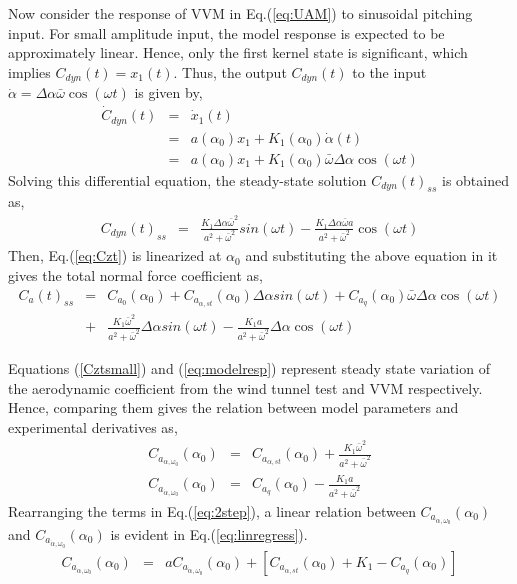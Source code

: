 \documentclass{AIAA}
\begin{document}
Now consider the response of VVM in Eq.(\ref{eq:UAM}) to sinusoidal pitching input. For small amplitude input, the model response is expected to be approximately linear. Hence, only the first kernel state is significant, which implies $C_{dyn}(t)=x_1(t)$. Thus, the output $C_{dyn}(t)$ to the input $\dot{\alpha}= \Delta\alpha \bar{\omega} \cos(\omega t)$ is given by,
\begin{eqnarray}
\dot{C}_{dyn}(t) &=& \dot{x}_1(t) \nonumber \\
&=& a(\alpha_0)x_1 + K_1(\alpha_0) \dot{\alpha}(t) \nonumber \\
&=& a(\alpha_0)x_1 + K_1(\alpha_0) \bar{\omega}\Delta\alpha \cos(\omega t)
\end{eqnarray}
Solving this differential equation, the steady-state solution $C_{dyn}(t)_{ss}$ is obtained as,
\begin{eqnarray}
C_{dyn}(t)_{ss} &=& \frac{K_1 \Delta \alpha \bar{\omega}^2 }{a^2 + \bar{\omega}^2} sin(\omega t)  -  \frac{K_1 \Delta \alpha \bar{\omega} a }{a^2 + \bar{\omega}^2} \cos(\omega t)
\end{eqnarray}
Then, Eq.(\ref{eq:Czt}) is linearized at $\alpha_0$ and substituting the above equation in it gives the total normal force coefficient as,
\begin{eqnarray}
\label{eq:modelresp}
C_a(t)_{ss} &=& C_{a_0}(\alpha_0) + C_{a_{\alpha,st}}(\alpha_0) \Delta \alpha sin(\omega t) +  C_{a_q}(\alpha_0) \bar{\omega} \Delta\alpha \cos(\omega t) \nonumber \\
&+& \frac{K_1 \bar{\omega}^2 }{a^2 + \bar{\omega}^2} \Delta \alpha sin(\omega t)  -  \frac{K_1 a }{a^2 + \bar{\omega}^2} \Delta \alpha  \cos(\omega t)
\end{eqnarray}

Equations (\ref{Cztsmall}) and (\ref{eq:modelresp}) represent steady state variation of the aerodynamic coefficient from the wind tunnel test and VVM respectively. Hence, comparing them gives the relation between model parameters and experimental derivatives as,
\begin{eqnarray}
\label{eq:2step}
C_{a_{\alpha,\omega_0}}(\alpha_0) &=&  C_{a_{\alpha,st}}(\alpha_0) +  \frac{K_1 \bar{\omega}^2 }{a^2 + \bar{\omega}^2}  \nonumber \\
C_{a_{\dot{\alpha},\omega_0}}(\alpha_0) &=&  C_{a_q}(\alpha_0)  -  \frac{K_1 a }{a^2 + \bar{\omega}^2}
\end{eqnarray}
Rearranging the terms in Eq.(\ref{eq:2step}), a linear relation between $C_{a_{\alpha,\omega_0}}(\alpha_0)$ and $C_{a_{\dot{\alpha},\omega_0}}(\alpha_0)$ is evident in Eq.(\ref{eq:linregress}). 
\begin{eqnarray}
\label{eq:linregress}
C_{a_{\alpha,\omega_0}}(\alpha_0) &=& a C_{a_{\dot{\alpha},\omega_0}}(\alpha_0) + [ C_{a_{\alpha,st}}(\alpha_0) + K_1 - C_{a_{q}}(\alpha_0) ]
\end{eqnarray}
\end{document}
